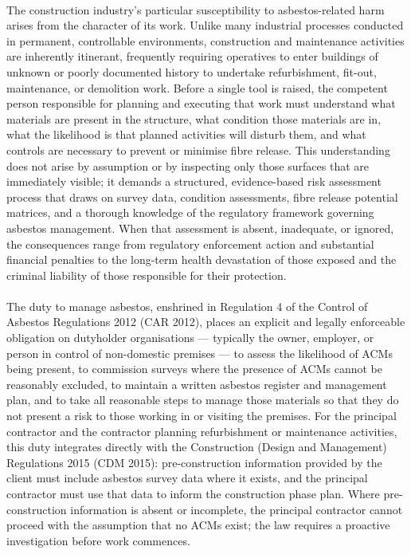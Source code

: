 \paragraph{}
The construction industry's particular susceptibility to asbestos-related harm arises from the character of its work. Unlike many industrial processes conducted in permanent, controllable environments, construction and maintenance activities are inherently itinerant, frequently requiring operatives to enter buildings of unknown or poorly documented history to undertake refurbishment, fit-out, maintenance, or demolition work. Before a single tool is raised, the competent person responsible for planning and executing that work must understand what materials are present in the structure, what condition those materials are in, what the likelihood is that planned activities will disturb them, and what controls are necessary to prevent or minimise fibre release. This understanding does not arise by assumption or by inspecting only those surfaces that are immediately visible; it demands a structured, evidence-based risk assessment process that draws on survey data, condition assessments, fibre release potential matrices, and a thorough knowledge of the regulatory framework governing asbestos management. When that assessment is absent, inadequate, or ignored, the consequences range from regulatory enforcement action and substantial financial penalties to the long-term health devastation of those exposed and the criminal liability of those responsible for their protection.

\paragraph{}
The duty to manage asbestos, enshrined in Regulation 4 of the Control of Asbestos Regulations 2012 (CAR 2012), places an explicit and legally enforceable obligation on dutyholder organisations — typically the owner, employer, or person in control of non-domestic premises — to assess the likelihood of ACMs being present, to commission surveys where the presence of ACMs cannot be reasonably excluded, to maintain a written asbestos register and management plan, and to take all reasonable steps to manage those materials so that they do not present a risk to those working in or visiting the premises. For the principal contractor and the contractor planning refurbishment or maintenance activities, this duty integrates directly with the Construction (Design and Management) Regulations 2015 (CDM 2015): pre-construction information provided by the client must include asbestos survey data where it exists, and the principal contractor must use that data to inform the construction phase plan. Where pre-construction information is absent or incomplete, the principal contractor cannot proceed with the assumption that no ACMs exist; the law requires a proactive investigation before work commences.

